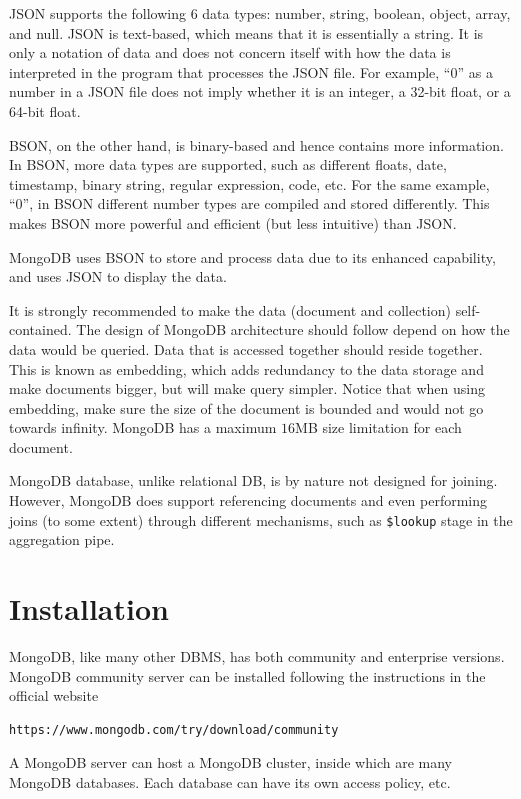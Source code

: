 \begin{shortbox}
	
	JSON supports the following 6 data types: number, string, boolean, object, array, and null. JSON is text-based, which means that it is essentially a string. It is only a notation of data and does not concern itself with how the data is interpreted in the program that processes the JSON file. For example, ``0'' as a number in a JSON file does not imply whether it is an integer, a 32-bit float, or a 64-bit float.
	
	BSON, on the other hand, is binary-based and hence contains more information. In BSON, more data types are supported, such as different floats, date, timestamp, binary string, regular expression, code, etc. For the same example, ``0'', in BSON different number types are compiled and stored differently. This makes BSON more powerful and efficient (but less intuitive) than JSON.
	
\end{shortbox}

MongoDB uses BSON to store and process data due to its enhanced capability, and uses JSON to display the data.

It is strongly recommended to make the data (document and collection) self-contained. The design of MongoDB architecture should follow depend on how the data would be queried. Data that is accessed together should reside together. This is known as embedding, which adds redundancy to the data storage and make documents bigger, but will make query simpler. Notice that when using embedding, make sure the size of the document is bounded and would not go towards infinity. MongoDB has a maximum $16$MB size limitation for each document.

MongoDB database, unlike relational DB, is by nature not designed for joining. However, MongoDB does support referencing documents and even performing joins (to some extent) through different mechanisms, such as \verb|$lookup| stage in the aggregation pipe.

\section{Installation}

MongoDB, like many other DBMS, has both community and enterprise versions. MongoDB community server can be installed following the instructions in the official website
\begin{lstlisting}
https://www.mongodb.com/try/download/community
\end{lstlisting}
A MongoDB server can host a MongoDB cluster, inside which are many MongoDB databases. Each database can have its own access policy, etc.

